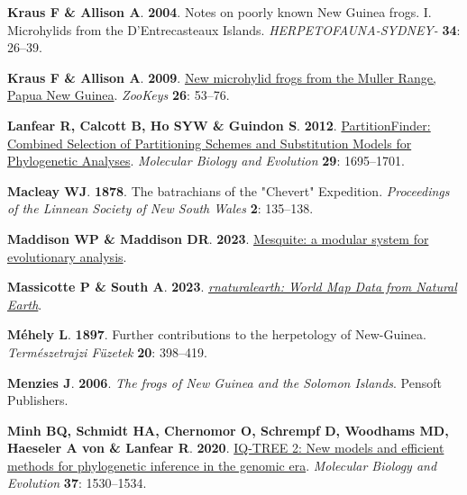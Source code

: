 \documentclass[
  letterpaper,
  DIV=11,
  numbers=noendperiod]{scrartcl}
\newlength{\cslhangindent}
\newenvironment{CSLReferences}[2] %
 {\begin{list}{}{%
  \setlength{\itemindent}{0pt}
  \setlength{\leftmargin}{0pt}
  \setlength{\parsep}{0pt}
  \ifodd #1
   \setlength{\leftmargin}{\cslhangindent}
   \setlength{\itemindent}{-1\cslhangindent}
  \fi
  \setlength{\itemsep}{#2\baselineskip}}}
 {\end{list}}
\begin{document}
\begin{CSLReferences}{0}{1}
\textbf{\textbf{Kraus F} \& \textbf{Allison A}}. \textbf{2004}. {Notes
on poorly known New Guinea frogs. I. Microhylids from the
D'Entrecasteaux Islands}. \emph{HERPETOFAUNA-SYDNEY-} \textbf{34}:
26--39.

\textbf{\textbf{Kraus F} \& \textbf{Allison A}}. \textbf{2009}.
\href{https://doi.org/10.3897/zookeys.26.258}{{New microhylid frogs from
the Muller Range, Papua New Guinea}}. \emph{ZooKeys} \textbf{26}:
53--76.

\textbf{\textbf{Lanfear R}, \textbf{Calcott B}, \textbf{Ho SYW} \&
\textbf{Guindon S}}. \textbf{2012}.
\href{https://doi.org/10.1093/molbev/mss020}{{PartitionFinder: Combined
Selection of Partitioning Schemes and Substitution Models for
Phylogenetic Analyses}}. \emph{Molecular Biology and Evolution}
\textbf{29}: 1695--1701.

\textbf{\textbf{Macleay WJ}}. \textbf{1878}. {The batrachians of the
"Chevert" Expedition}. \emph{Proceedings of the Linnean Society of New
South Wales} \textbf{2}: 135--138.

\textbf{\textbf{Maddison WP} \& \textbf{Maddison DR}}. \textbf{2023}.
\href{http://www.mesquiteproject.org}{{Mesquite: a modular system for
evolutionary analysis}}.

\textbf{\textbf{Massicotte P} \& \textbf{South A}}. \textbf{2023}.
\emph{\href{https://CRAN.R-project.org/package=rnaturalearth}{{rnaturalearth:
World Map Data from Natural Earth}}}.

\textbf{\textbf{Méhely L}}. \textbf{1897}. {Further contributions to the
herpetology of New-Guinea}. \emph{Term{é}szetrajzi F{ü}zetek}
\textbf{20}: 398--419.

\textbf{\textbf{Menzies J}}. \textbf{2006}. \emph{{The frogs of New
Guinea and the Solomon Islands}}. Pensoft Publishers.

\textbf{\textbf{Minh BQ}, \textbf{Schmidt HA}, \textbf{Chernomor O},
\textbf{Schrempf D}, \textbf{Woodhams MD}, \textbf{Haeseler A von} \&
\textbf{Lanfear R}}. \textbf{2020}.
\href{https://doi.org/10.1093/molbev/msaa015}{IQ-TREE 2: New models and
efficient methods for phylogenetic inference in the genomic era}.
\emph{Molecular Biology and Evolution} \textbf{37}: 1530--1534.


\end{CSLReferences}
\end{document}

